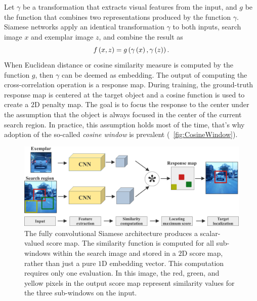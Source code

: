 Let $\gamma$ be a transformation that extracts visual features from the input, and $g$ be the function that combines two representations produced by the function $\gamma$. Siamese networks apply an identical transformation $\gamma$ to both inputs, search image $x$ and exemplar image $z$, and combine the result as
\begin{equation}
    {f} \left( x, z \right) = {g} \left( {\gamma} \left( x \right), {\gamma} \left( z \right) \right).
\end{equation}
When Euclidean distance or cosine similarity measure is computed by the function $g$, then $\gamma$ can be deemed as embedding. The output of computing the cross-correlation operation is a response map. During training, the ground-truth response map is centered at the target object and a cosine function is used to create a $2$D penalty map. The goal is to focus the response to the center under the assumption that the object is always focused in the center of the current search region. In practice, this assumption holds most of the time, that's why adoption of the so-called \emph{cosine window} is prevalent (\figtext{}~\ref{fig:CosineWindow}).

\begin{figure}[!t]
    \centerline{\includegraphics[width=0.9\linewidth]{figures/theoretical_foundations/fully_cnn_siam_tracking_architecture.pdf}}
    \caption[\gls{siamfc} architecture]{The fully convolutional Siamese architecture produces a scalar-valued score map. The similarity function is computed for all sub-windows within the search image and stored in a $2$D score map, rather than just a pure $1$D embedding vector. This computation requires only one evaluation. In this image, the red, green, and yellow pixels in the output score map represent similarity values for the three sub-windows on the input.}
    \label{fig:FullyCNNSiamTrackingArch}
\end{figure}


